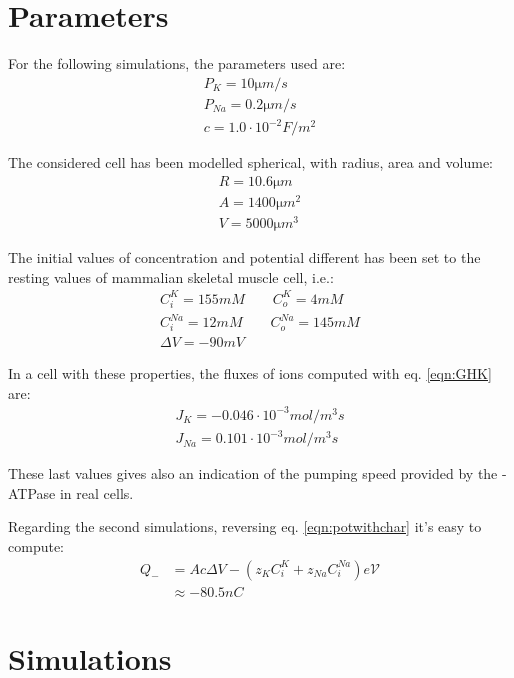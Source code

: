 \documentclass[11pt,a4 paper]{article}
\begin{document}
\section{Parameters}
For the following simulations, the parameters used are:
\begin{gather*}
    P_{K} = 10 \si{\micro m/s} \\
    P_{Na} = 0.2 \si{\micro m/s} \\
    c = 1.0 \cdot 10^{-2} \si{F / m^2}
\end{gather*}

The considered cell has been modelled spherical, with radius, area and volume:
\begin{align*}
    R = 10.6 \si{\micro m} \\
    A = 1400 \si{\micro m^2} \\
    V = 5000 \si{\micro m^3}
\end{align*}

The initial values of concentration and potential different has been set to the resting values of mammalian skeletal muscle cell, i.e.:
\begin{gather*}
    C_i^K = 155 \si{mM} \qquad C_o^K = 4\si{mM} \\
    C_i^{Na} = 12 \si{mM} \qquad C_o^{Na} = 145\si{mM} \\
    \Delta V = -90 \si{mV}
\end{gather*}

In a cell with these properties, the fluxes of ions computed with eq. \eqref{eqn:GHK} are:
\begin{gather*}
    J_K = -0.046 \cdot 10^{-3} \si{mol / m^3s} \\
    J_{Na} = 0.101 \cdot 10^{-3} \si{mol / m^3s}
\end{gather*}

These last values gives also an indication of the pumping speed provided by the -ATPase in real cells.

\bigskip
Regarding the second simulations, reversing eq. \ref{eqn:potwithchar} it's easy to compute:
\begin{align*}
    Q_- &= Ac\Delta V - (z_KC_i^K + z_{Na}C_i^{Na})e\mathcal{V} \\
    &\approx -80.5 \si{nC}
\end{align*}

\section{Simulations}
\end{document}
